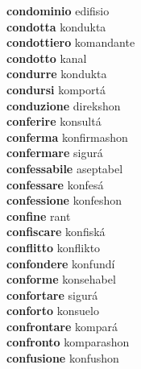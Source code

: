 \textbf{condominio } edifisio \\
\textbf{condotta } kondukta \\
\textbf{condottiero } komandante \\
\textbf{condotto } kanal \\
\textbf{condurre } kondukta \\
\textbf{condursi } komportá \\
\textbf{conduzione } direkshon \\
\textbf{conferire } konsultá \\
\textbf{conferma } konfirmashon \\
\textbf{confermare } sigurá \\
\textbf{confessabile } aseptabel \\
\textbf{confessare } konfesá \\
\textbf{confessione } konfeshon \\
\textbf{confine } rant \\
\textbf{confiscare } konfiská \\
\textbf{conflitto } konflikto \\
\textbf{confondere } konfundí \\
\textbf{conforme } konsehabel \\
\textbf{confortare } sigurá \\
\textbf{conforto } konsuelo \\
\textbf{confrontare } kompará \\
\textbf{confronto } komparashon \\
\textbf{confusione } konfushon \\

